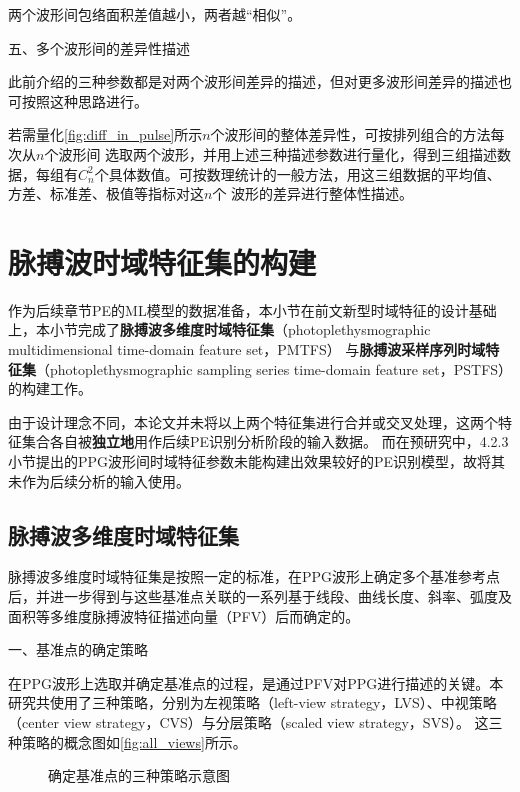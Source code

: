 两个波形间包络面积差值越小，两者越“相似”。

五、多个波形间的差异性描述

此前介绍的三种参数都是对两个波形间差异的描述，但对更多波形间差异的描述也可按照这种思路进行。

若需量化\autoref{fig:diff_in_pulse}所示$n$个波形间的整体差异性，可按排列组合的方法每次从$n$个波形间
选取两个波形，并用上述三种描述参数进行量化，得到三组描述数据，每组有$C_n^2$个具体数值。可按数理统计的一般方法，用这三组数据的平均值、方差、标准差、极值等指标对这$n$个
波形的差异进行整体性描述。

\section{脉搏波时域特征集的构建}
作为后续章节PE的ML模型的数据准备，本小节在前文新型时域特征的设计基础上，本小节完成了\textbf{脉搏波多维度时域特征集}（photoplethysmographic multidimensional time-domain feature set，PMTFS）
与\textbf{脉搏波采样序列时域特征集}（photoplethysmographic sampling series time-domain feature set，PSTFS）的构建工作。

由于设计理念不同，本论文并未将以上两个特征集进行合并或交叉处理，这两个特征集合各自被\textbf{独立地}用作后续PE识别分析阶段的输入数据。
而在预研究中，4.2.3小节提出的PPG波形间时域特征参数未能构建出效果较好的PE识别模型，故将其未作为后续分析的输入使用。

\subsection{脉搏波多维度时域特征集}

脉搏波多维度时域特征集是按照一定的标准，在PPG波形上确定多个基准参考点后，并进一步得到与这些基准点关联的一系列基于线段、曲线长度、斜率、弧度及面积等多维度脉搏波特征描述向量（PFV）后而确定的。

一、基准点的确定策略

在PPG波形上选取并确定基准点的过程，是通过PFV对PPG进行描述的关键。本研究共使用了三种策略，分别为左视策略（left-view strategy，LVS）、中视策略（center view strategy，CVS）与分层策略（scaled view strategy，SVS）。
这三种策略的概念图如\autoref{fig:all_views}所示。
\begin{figure}[htbp]
    \centering
    \quad
    \quad
    \caption{\label{fig:all_views}确定基准点的三种策略示意图}
\end{figure}

